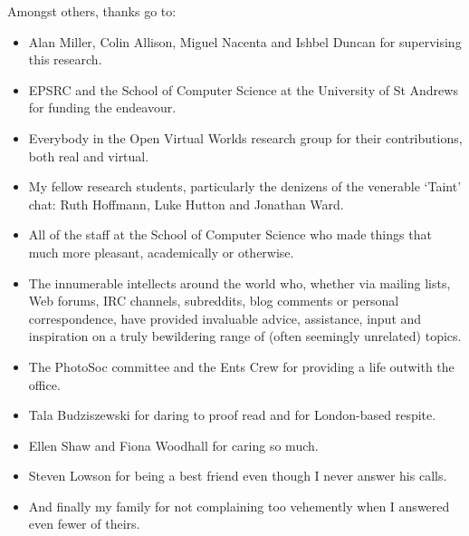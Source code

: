 Amongst others, thanks go to:

\begin{itemize}

	\item Alan Miller, Colin Allison, Miguel Nacenta and Ishbel Duncan for supervising this research.
	
	\item EPSRC and the School of Computer Science at the University of St Andrews for funding the endeavour.
	
	\item Everybody in the Open Virtual Worlds research group for their contributions, both real and virtual.
	
	\item My fellow research students, particularly the denizens of the venerable `Taint' chat: Ruth Hoffmann, Luke Hutton and Jonathan Ward.
	
	\item All of the staff at the School of Computer Science who made things that much more pleasant, academically or otherwise.
	
	\item The innumerable intellects around the world who, whether via mailing lists, Web forums, IRC channels, subreddits, blog comments or personal correspondence, have provided invaluable advice, assistance, input and inspiration on a truly bewildering range of (often seemingly unrelated) topics.
	
	\item The PhotoSoc committee and the Ents Crew for providing a life outwith the office.
	
	\item Tala Budziszewski for daring to proof read and for London-based respite.
	
	\item Ellen Shaw and Fiona Woodhall for caring so much.
	
	\item Steven Lowson for being a best friend even though I never answer his calls.
	
	\item And finally my family for not complaining too vehemently when I answered even fewer of theirs.

\end{itemize}